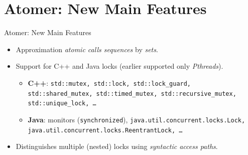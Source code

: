 \documentclass[10pt, hyperref={unicode}, aspectratio=169]{beamer}
\begin{document}
\section{Atomer: New Main Features}
\begin{frame}{Atomer: New Main Features}
    \begin{itemize}\setlength\itemsep{3em}
        \item
            \alert{Approximation} \emph{atomic calls sequences} by
            \emph{sets}.
            
        \item
            Support for \alert{C++ and Java locks} (earlier supported
            only \emph{Pthreads}).
            
            \smallskip
            
            \begin{itemize}\setlength\itemsep{1em}
                \item 
                    \textbf{C++}: \texttt{std::mutex, std::lock,
                    std::lock\_guard, std::shared\_mutex,
                    std::timed\_mutex, std::recursive\_mutex,
                    std::unique\_lock, \ldots}
                    
                \item
                    \textbf{Java}: monitors (\texttt{synchronized}),
                    \texttt{java.util.concurrent.locks.Lock,
                    java.util.concurrent.locks.ReentrantLock, \ldots}
            \end{itemize}
            
        \item
            Distinguishes \alert{multiple (nested) locks} using
            \emph{syntactic access paths}.
    \end{itemize}
\end{frame}
\end{document}
